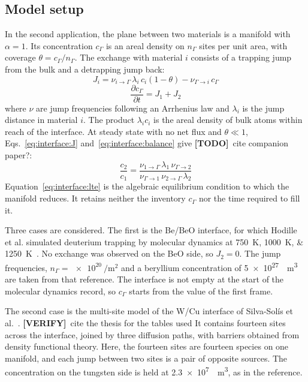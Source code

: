 \documentclass[5p]{elsarticle}
\newcommand{\TODO}[1]{\textcolor{BrickRed}{\textbf{[TODO]}~#1}}
\newcommand{\VERIFY}[1]{\textcolor{RedOrange}{\textbf{[VERIFY]}~#1}}
\begin{document}
\subsection{Model setup}
\label{sec:app:interface:setup}

In the second application, the plane between two materials is a manifold with $\alpha = 1$.
Its concentration $c_\Gamma$ is an areal density on $n_\Gamma$ sites per unit area, with coverage $\theta = c_\Gamma / n_\Gamma$.
The exchange with material $i$ consists of a trapping jump from the bulk and a detrapping jump back:
\begin{equation}
    J_i = \nu_{i \rightarrow \Gamma}\, \lambda_i\, c_i \left( 1 - \theta \right) - \nu_{\Gamma \rightarrow i}\, c_\Gamma
    \label{eq:interface:J}
\end{equation}
\begin{equation}
    \frac{\partial c_\Gamma}{\partial t} = J_1 + J_2
    \label{eq:interface:balance}
\end{equation}
where $\nu$ are jump frequencies following an Arrhenius law and $\lambda_i$ is the jump distance in material $i$.
The product $\lambda_i c_i$ is the areal density of bulk atoms within reach of the interface.
At steady state with no net flux and $\theta \ll 1$, Eqs.~\ref{eq:interface:J} and~\ref{eq:interface:balance} give \cite{} \TODO{cite companion paper?}:
\begin{equation}
    \frac{c_2}{c_1} = \frac{\nu_{1 \rightarrow \Gamma}\, \lambda_1\, \nu_{\Gamma \rightarrow 2}}{\nu_{\Gamma \rightarrow 1}\, \nu_{2 \rightarrow \Gamma}\, \lambda_2}
    \label{eq:interface:lte}
\end{equation}
Equation~\ref{eq:interface:lte} is the algebraic equilibrium condition to which the manifold reduces.
It retains neither the inventory $c_\Gamma$ nor the time required to fill it.

Three cases are considered.
The first is the Be/BeO interface, for which Hodille et al. simulated deuterium trapping by molecular dynamics at \qtylist{750;1000;1250}{\kelvin}~\cite{hodille_molecular_2022}.
No exchange was observed on the BeO side, so $J_2 = 0$.
The jump frequencies, $n_\Gamma = \qty{e20}{\per\metre\squared}$ and a beryllium concentration of \qty{5e27}{\per\metre\cubed} are taken from that reference.
The interface is not empty at the start of the molecular dynamics record, so $c_\Gamma$ starts from the value of the first frame.

The second case is the multi-site model of the W/Cu interface of Silva-Sol\'is et al.~\cite{silva-solis_hydrogen_2026}. \VERIFY{cite the thesis for the tables used}
It contains fourteen sites across the interface, joined by three diffusion paths, with barriers obtained from density functional theory.
Here, the fourteen sites are fourteen species on one manifold, and each jump between two sites is a pair of opposite sources.
The concentration on the tungsten side is held at \qty{2.3e7}{\per\metre\cubed}, as in the reference.
\end{document}

